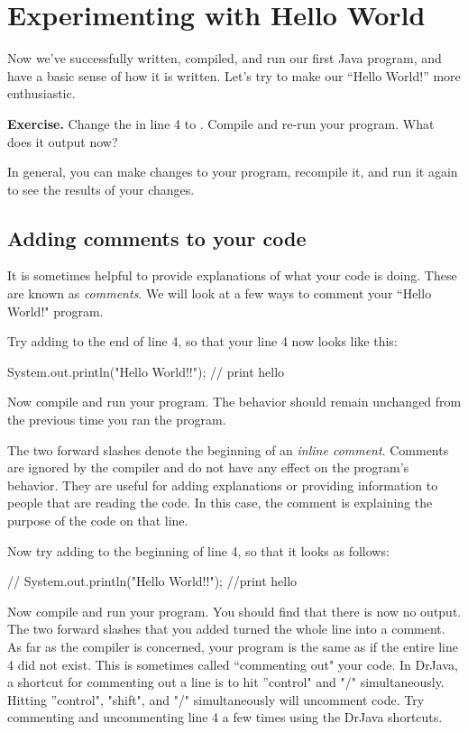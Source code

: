\section{Experimenting with Hello World}
Now we've successfully written, compiled, and run our first Java program, and have a basic sense of how it is written.
Let's try to make our ``Hello World!'' more enthusiastic.
\newline

\textbf{Exercise.} Change the  in line 4 to . Compile and re-run your program. What does it output now? 
\newline

 In general,
you can make changes to your program, recompile it, and run it again
to see the results of your changes.

\subsection{Adding comments to your code}

It is sometimes helpful to provide explanations of what your code is doing. These are known as \emph{comments}. We will look at a few ways to comment your ``Hello World!" program.

Try adding  to the end of line 4, so that your line 4 now looks like this:
\begin{code}
        System.out.println("Hello World!!"); // print hello
\end{code}

Now compile and run your program. The behavior should remain unchanged from the previous time you ran the program.

The two forward slashes \ic{//} denote the beginning of an \emph{inline comment}. Comments are ignored by the compiler and do not have any effect on
the program's behavior. They are
useful for adding explanations or providing information to people that are reading the code. In this case,
the comment  is explaining the purpose of the code on that line.

Now try adding \ic{//} to the beginning of line 4, so that it looks as follows:
\begin{code}
//        System.out.println("Hello World!!"); //print hello
\end{code}
Now compile and run your program. You should find that there is now no output. The two forward slashes that you added turned the whole line into a comment. As far as the compiler is concerned, your program is the same
as if the entire line 4 did not exist. This is sometimes called ``commenting out" your code. In DrJava, a shortcut for commenting out a line is to hit ''control" and "/" simultaneously. Hitting ''control", "shift", and "/" simultaneously will uncomment code. Try commenting and uncommenting line 4 a few times using the DrJava shortcuts. 

